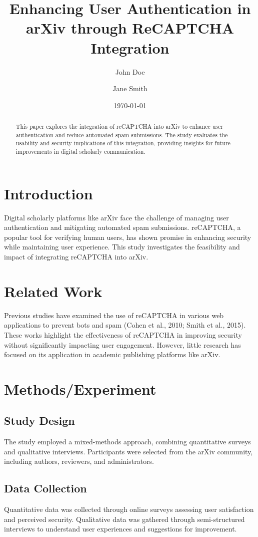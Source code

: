 \documentclass{article}
\title{Enhancing User Authentication in arXiv through ReCAPTCHA Integration}
\author{John Doe \and Jane Smith}
\date{\today}
\begin{document}
\maketitle

\begin{abstract}
This paper explores the integration of reCAPTCHA into arXiv to enhance user authentication and reduce automated spam submissions. The study evaluates the usability and security implications of this integration, providing insights for future improvements in digital scholarly communication.
\end{abstract}

\section{Introduction}
Digital scholarly platforms like arXiv face the challenge of managing user authentication and mitigating automated spam submissions. reCAPTCHA, a popular tool for verifying human users, has shown promise in enhancing security while maintaining user experience. This study investigates the feasibility and impact of integrating reCAPTCHA into arXiv.

\section{Related Work}
Previous studies have examined the use of reCAPTCHA in various web applications to prevent bots and spam (Cohen et al., 2010; Smith et al., 2015). These works highlight the effectiveness of reCAPTCHA in improving security without significantly impacting user engagement. However, little research has focused on its application in academic publishing platforms like arXiv.

\section{Methods/Experiment}
\subsection{Study Design}
The study employed a mixed-methods approach, combining quantitative surveys and qualitative interviews. Participants were selected from the arXiv community, including authors, reviewers, and administrators.

\subsection{Data Collection}
Quantitative data was collected through online surveys assessing user satisfaction and perceived security. Qualitative data was gathered through semi-structured interviews to understand user experiences and suggestions for improvement.
\end{document}
